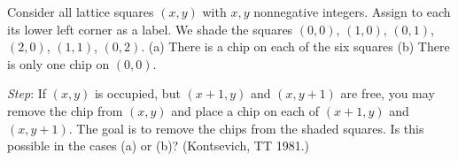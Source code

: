Consider all lattice squares $(x, y)$ with $x, y$ nonnegative integers. Assign to each its lower left corner as a label. We shade the squares $(0, 0)$, $(1, 0)$, $(0, 1)$, $(2, 0)$, $(1, 1)$, $(0, 2)$. (a) There is a chip on each of the six squares (b) There is only one chip on $(0, 0)$.

\emph{Step}: If $(x, y)$ is occupied, but $(x + 1, y)$ and $(x, y + 1)$ are free, you may remove the chip from $(x, y)$ and place a chip on each of $(x + 1, y)$ and $(x, y + 1)$. The goal is to remove the chips from the shaded squares. Is this possible in the cases (a) or (b)? (Kontsevich, TT 1981.)
